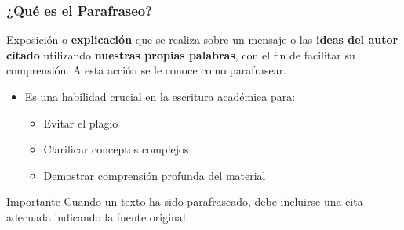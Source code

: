 \documentclass[aspectratio=169]{beamer}
\begin{document}
\begin{frame}
	\frametitle{¿Qué es el Parafraseo?}
	\begin{definition}
		Exposición o \textbf{explicación} que se realiza sobre un mensaje o las \textbf{ideas del autor citado} utilizando \textbf{nuestras propias palabras}, con el fin de facilitar su comprensión. A esta acción se le conoce como \alert{parafrasear}.
	\end{definition}
	
	\vspace{0.5em}
	
	\begin{itemize}
		\item Es una habilidad crucial en la escritura académica para:
		\begin{itemize}
			\item Evitar el plagio
			\item Clarificar conceptos complejos
			\item Demostrar comprensión profunda del material
		\end{itemize}
	\end{itemize}
	
	\vspace{0.5em}
	
	\begin{alertblock}{Importante}
		Cuando un texto ha sido parafraseado, debe incluirse una cita adecuada indicando la fuente original.
	\end{alertblock}
\end{frame}
\end{document}

